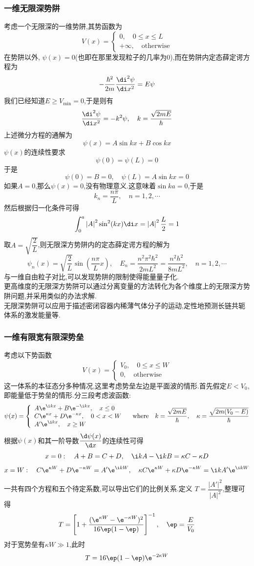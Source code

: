 \documentclass{ctexbook}
\begin{document}
\subsubsection{一维无限深势阱}
考虑一个无限深的一维势阱,其势函数为
\[V(x)=\left\{\begin{array}{l}
    0,\quad 0\leq x\leq L\\
    +\infty,\quad\text{otherwise}
\end{array}\right.\]
在势阱以外, $\psi(x)=0$(也即在那里发现粒子的几率为$0$),而在势阱内定态薛定谔方程为
\[-\dfrac{\hbar^2}{2m}\dfrac{\di^2\psi}{\di x^2}=E\psi\]
我们已经知道$E\geq V_{\min}=0$,于是则有
\[\dfrac{\di^2\psi}{\di x^2}=-k^2\psi,\quad k=\dfrac{\sqrt{2mE}}{\hbar}\]
上述微分方程的通解为
\[\psi(x)=A\sin kx+B\cos kx\]
$\psi(x)$的连续性要求
\[\psi(0)=\psi(L)=0\]
于是
\[\psi(0)=B=0,\quad \psi(L)=A\sin kx=0\]
如果$A=0$,那么$\psi(x)=0$,没有物理意义.这意味着$\sin ka=0$,于是
\[k_n=\dfrac{n\pi}{L},\quad n=1,2,\cdots\]
然后根据归一化条件可得
\[\int_0^a\left|A\right|^2\sin^2(kx)\di x=\left|A\right|^2\dfrac{L}{2}=1\]
取$A=\sqrt{\dfrac{2}{L}}$,则无限深方势阱内的定态薛定谔方程的解为
\[\psi_n(x)=\sqrt{\dfrac{2}{L}}\sin\left(\dfrac{n\pi}{L}x\right),\quad E_n=\dfrac{n^2\pi^2\hbar^2}{2mL^2}=\dfrac{n^2h^2}{8mL^2},\quad n=1,2,\cdots\]
与一维自由粒子对比,可以发现势阱的限制使得能量量子化.\\
\indent 更高维度的无限深方势阱可以通过分离变量的方法转化为各个维度上的无限深方势阱问题,并采用类似的办法求解.\\
\indent 无限深势阱可以应用于描述密闭容器内稀薄气体分子的运动,定性地预测长链共轭体系的激发能量等.
\subsubsection{一维有限宽有限深势垒}
考虑以下势函数
\[V(x)=\left\{\begin{array}{l}
    V_0,\quad0\leq x\leq W\\
    0,\quad\text{otherwise}
\end{array}\right.\]
这一体系的本征态分多种情况,这里考虑势垒左边是平面波的情形.首先假定$E<V_0$,即能量低于势垒的情形.分三段考虑波函数:
\[\psi(x)=\left\{\begin{array}{l}
    A\e^{\i kx}+B\e^{-\i kx},\quad x\leq0\\
    C\e^{\kappa x}+D\e^{-\kappa x},\quad 0<x<W\\
    A'\e^{\i kx},\quad x\geq W
\end{array}\right.\quad\text{where}\quad k=\dfrac{\sqrt{2mE}}{\hbar},\quad \kappa=\dfrac{\sqrt{2m(V_0-E)}}{\hbar}\]
根据$\psi(x)$和其一阶导数$\dfrac{\d\psi(x)}{\d x}$的连续性可得
\[x=0:\quad A+B=C+D,\quad \i kA-\i kB=\kappa C-\kappa D\]
\[x=W:\quad C\e^{\kappa W}+D\e^{-\kappa W}=A'\e^{\i k W},\quad \kappa C\e^{\kappa W}+\kappa D\e^{-\kappa W}=\i kA'\e^{\i k W}\]
一共有四个方程和五个待定系数,可以导出它们的比例关系.定义 $T=\dfrac{|A'|^2}{|A|^2}$,整理可得
\[T=\left[1+\dfrac{(\e^{\kappa W}-\e^{-\kappa W})^2}{16\ep(1-\ep)}\right]^{-1},\quad \ep=\dfrac{E}{V_0}\]
对于宽势垒有$\kappa W\gg1$,此时
\[T=16\ep(1-\ep)\e^{-2\kappa W}\]
\end{document}

